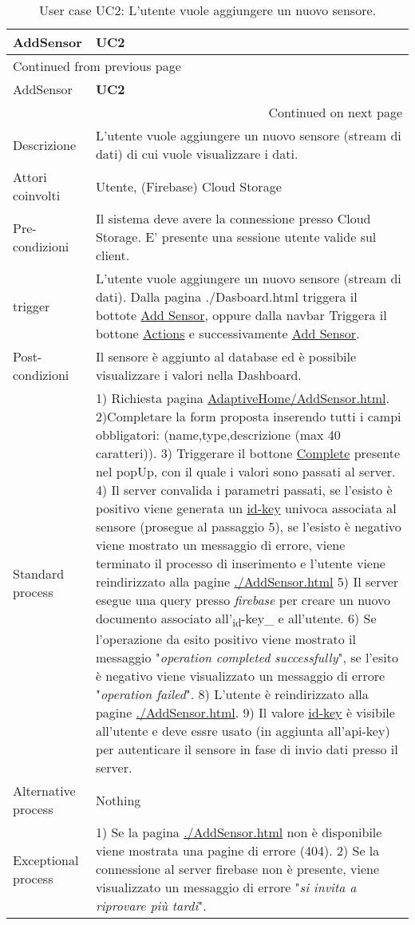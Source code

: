 \documentclass[onecolumn,a4paper]{article}
\begin{document}
\begin{longtable}{|l|p{9.7cm}|}
\caption{User case UC2: L'utente vuole aggiungere un nuovo sensore.}
\\
\cellcolor{grey!15}AddSensor & \cellcolor{grey!15} \textbf{UC2}\\
\hline
\endfirsthead
\multicolumn{2}{l}{Continued from previous page} \\
\hline

\cellcolor{grey!15}AddSensor & \cellcolor{grey!15} \textbf{UC2} \\

\hline
\endhead
\hline\multicolumn{2}{r}{Continued on next page} \\
\endfoot
\endlastfoot
\hline
Descrizione & L'utente vuole aggiungere un nuovo sensore (stream di dati) di cui vuole visualizzare i dati.\\
\hline
Attori coinvolti & Utente, (Firebase) Cloud Storage\\
\hline
Pre-condizioni & Il sistema deve avere la connessione presso Cloud Storage. E' presente una sessione utente valide sul client.\\
\hline
trigger & L'utente vuole aggiungere un nuovo sensore (stream di dati). Dalla pagina ./Dasboard.html triggera il bottote \uline{Add Sensor}, oppure dalla navbar Triggera il bottone \uline{Actions} e successivamente \uline{Add Sensor}.\\
\hline
Post-condizioni & Il sensore è aggiunto al database ed è possibile visualizzare i valori nella Dashboard.\\
\hline
Standard process & 1) Richiesta pagina \uline{AdaptiveHome/AddSensor.html}. 2)Completare la form proposta inserendo tutti i campi obbligatori: (name,type,descrizione (max 40 caratteri)). 3) Triggerare il bottone \uline{Complete} presente nel popUp, con il quale i valori sono passati al server. 4) Il server convalida i parametri passati, se l'esisto è positivo viene generata un \uline{id-key} univoca associata al sensore (prosegue al passaggio 5), se l'esisto è negativo viene mostrato un messaggio di errore, viene terminato il processo di inserimento e l'utente viene reindirizzato alla pagine \uline{./AddSensor.html} 5) Il server esegue una query presso \emph{firebase} per creare un nuovo documento associato all'\textsubscript{id}-key\_ e all'utente. 6) Se l'operazione da esito positivo viene mostrato il messaggio "\emph{operation completed successfully}", se l'esito è negativo viene visualizzato un messaggio di errore "\emph{operation failed}". 8) L'utente è reindirizzato alla pagine \uline{./AddSensor.html}. 9) Il valore \uline{id-key} è visibile all'utente e deve essre usato (in aggiunta all'api-key) per autenticare il sensore in fase di invio dati presso il server.\\
\hline
Alternative process & Nothing\\
\hline
Exceptional process & 1) Se la pagina \uline{./AddSensor.html} non è disponibile viene mostrata una pagine di errore (404). 2) Se la connessione al server firebase non è presente, viene visualizzato un messaggio di errore "\emph{si invita a riprovare più tardi}".\\
\hline
\end{longtable}
\end{document}
